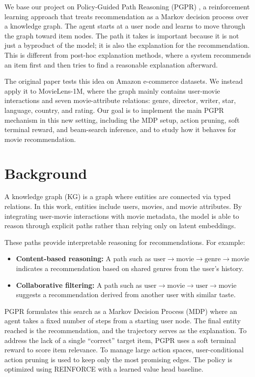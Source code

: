 \documentclass{article}
\begin{document}
We base our project on Policy-Guided Path Reasoning (PGPR) \citep{xian2019pgpr}, a reinforcement learning approach that treats recommendation as a Markov decision process over a knowledge graph. The agent starts at a user node and learns to move through the graph toward item nodes. The path it takes is important because it is not just a byproduct of the model; it is also the explanation for the recommendation. This is different from post-hoc explanation methods, where a system recommends an item first and then tries to find a reasonable explanation afterward.

The original paper tests this idea on Amazon e-commerce datasets. We instead apply it to MovieLens-1M, where the graph mainly contains user-movie interactions and seven movie-attribute relations: genre, director, writer, star, language, country, and rating. Our goal is to implement the main PGPR mechanism in this new setting, including the MDP setup, action pruning, soft terminal reward, and beam-search inference, and to study how it behaves for movie recommendation.

\section{Background}

A knowledge graph (KG) is a graph where entities are connected via typed relations. In this work, entities include users, movies, and movie attributes. By integrating user-movie interactions with movie metadata, the model is able to reason through explicit paths rather than relying only on latent embeddings.

These paths provide interpretable reasoning for recommendations. For example:
\begin{itemize}[leftmargin=*]
    \item \textbf{Content-based reasoning:} A path such as
    $\text{user} \to \text{movie} \to \text{genre} \to \text{movie}$
    indicates a recommendation based on shared genres from the user's history.
    \item \textbf{Collaborative filtering:} A path such as
    $\text{user} \to \text{movie} \to \text{user} \to \text{movie}$
    suggests a recommendation derived from another user with similar taste.
\end{itemize}

PGPR formulates this search as a Markov Decision Process (MDP) where an agent takes a fixed number of steps from a starting user node. The final entity reached is the recommendation, and the trajectory serves as the explanation. To address the lack of a single ``correct'' target item, PGPR uses a soft terminal reward to score item relevance. To manage large action spaces, user-conditional action pruning is used to keep only the most promising edges. The policy is optimized using REINFORCE with a learned value head baseline.
\end{document}
